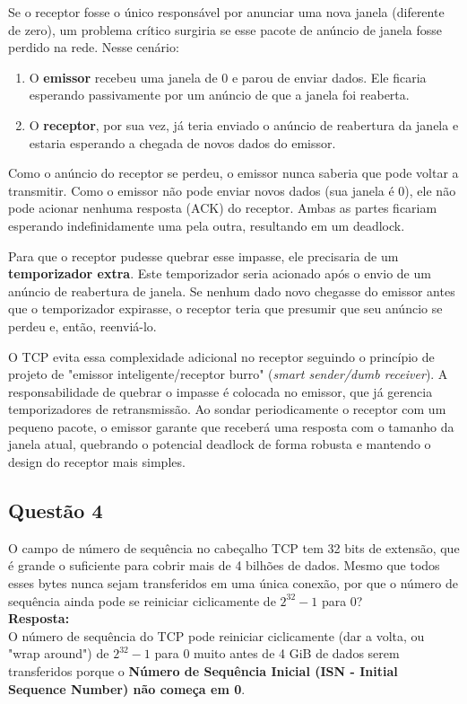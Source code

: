 Se o receptor fosse o único responsável por anunciar uma nova janela (diferente de zero), um problema crítico surgiria se esse pacote de anúncio de janela fosse perdido na rede. Nesse cenário:
\begin{enumerate}
    \item O \textbf{emissor} recebeu uma janela de 0 e parou de enviar dados. Ele ficaria esperando passivamente por um anúncio de que a janela foi reaberta. 
    \item O \textbf{receptor}, por sua vez, já teria enviado o anúncio de reabertura da janela e estaria esperando a chegada de novos dados do emissor. 
\end{enumerate}

Como o anúncio do receptor se perdeu, o emissor nunca saberia que pode voltar a transmitir. Como o emissor não pode enviar novos dados (sua janela é 0), ele não pode acionar nenhuma resposta (ACK) do receptor. Ambas as partes ficariam esperando indefinidamente uma pela outra, resultando em um deadlock.

Para que o receptor pudesse quebrar esse impasse, ele precisaria de um \textbf{temporizador extra}. Este temporizador seria acionado após o envio de um anúncio de reabertura de janela. Se nenhum dado novo chegasse do emissor antes que o temporizador expirasse, o receptor teria que presumir que seu anúncio se perdeu e, então, reenviá-lo.

O TCP evita essa complexidade adicional no receptor seguindo o princípio de projeto de "emissor inteligente/receptor burro" (\textit{smart sender/dumb receiver}).  A responsabilidade de quebrar o impasse é colocada no emissor, que já gerencia temporizadores de retransmissão. Ao sondar periodicamente o receptor com um pequeno pacote, o emissor garante que receberá uma resposta com o tamanho da janela atual, quebrando o potencial deadlock de forma robusta e mantendo o design do receptor mais simples. 

\subsection{Questão 4}
O campo de número de sequência no cabeçalho TCP tem 32 bits de extensão, que é grande o
suficiente para cobrir mais de 4 bilhões de dados. Mesmo que todos esses bytes nunca sejam
transferidos em uma única conexão, por que o número de sequência ainda pode se reiniciar
ciclicamente de $2^{32}-1$ para 0?\\

\noindent
\textbf{Resposta:} \\
O número de sequência do TCP pode reiniciar ciclicamente (dar a volta, ou "wrap around") de $2^{32}-1$ para 0 muito antes de 4 GiB de dados serem transferidos porque o \textbf{Número de Sequência Inicial (ISN - Initial Sequence Number) não começa em 0}. 


